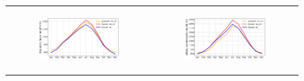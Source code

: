 \begin{figure}[htbp]
\begin{tabular}{cc}
        \begin{subfigure}[b]{0.5\textwidth}
            \caption{}
            \includegraphics[width=\textwidth]{images/chap4/future/SC_s_pblh_presfutirr.png}
        \end{subfigure} &
        \begin{subfigure}[b]{0.5\textwidth}
            \caption{}
            \includegraphics[width=\textwidth]{images/chap4/future/SC_s_lcl_presfutirr.png}
        \end{subfigure} \\
    \end{tabular}
    \caption{}
    \label{fig:SC_future_irr}
\end{figure}


